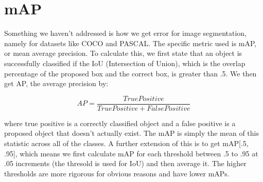 \documentclass{article}
\begin{document}
\section{mAP}
Something we haven't addressed is how we get error for image segmentation, namely for datasets like COCO and PASCAL. The specific metric used is mAP, or mean average precision. To calculate this, we first state that an object is successfully classified if the IoU (Intersection of Union), which is the overlap percentage of the proposed box and the correct box, is greater than .5. We then get AP, the average precision by:

$$ AP = \frac{True Positive}{True Positive + False Positive} $$

where true positive is a correctly classified object and a false positive is a proposed object that doesn't actually exist. The mAP is simply the mean of this statistic across all of the classes. A further extension of this is to get mAP[.5, .95], which means we first calculate mAP for each threshold between .5 to .95 at .05 increments (the thresold is used for IoU) and then average it. The higher thresholds are more rigorous for obvious reasons and have lower mAPs.
\end{document}
